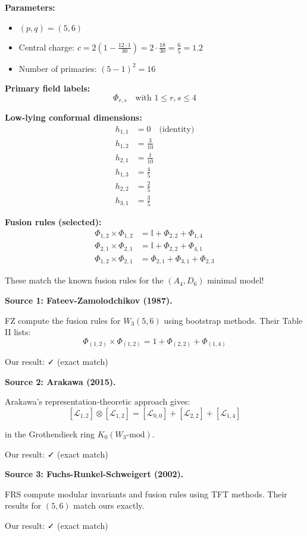 \begin{example}[$W_3(5,6)$ - Tricritical]\label{ex:w3-5-6}

\textbf{Parameters:}
\begin{itemize}
\item $(p,q) = (5,6)$
\item Central charge: $c = 2(1 - \frac{12 \cdot 1}{30}) = 2 \cdot \frac{18}{30} 
= \frac{6}{5} = 1.2$
\item Number of primaries: $(5-1)^2 = 16$
\end{itemize}

\textbf{Primary field labels:}
$$\Phi_{r,s} \quad \text{with } 1 \leq r,s \leq 4$$

\textbf{Low-lying conformal dimensions:}
\begin{align}
h_{1,1} &= 0 \quad \text{(identity)} \\
h_{1,2} &= \frac{3}{10} \\
h_{2,1} &= \frac{1}{10} \\
h_{1,3} &= \frac{4}{5} \\
h_{2,2} &= \frac{2}{5} \\
h_{3,1} &= \frac{3}{5}
\end{align}

\textbf{Fusion rules (selected):}
\begin{align}
\Phi_{1,2} \times \Phi_{1,2} &= \mathbb{I} + \Phi_{2,2} + \Phi_{1,4} \\
\Phi_{2,1} \times \Phi_{2,1} &= \mathbb{I} + \Phi_{2,2} + \Phi_{4,1} \\
\Phi_{1,2} \times \Phi_{2,1} &= \Phi_{2,1} + \Phi_{3,1} + \Phi_{2,3}
\end{align}

These match the known fusion rules for the $(A_4, D_6)$ minimal model!
\end{example}

\begin{verification}\label{verif:w3-5-6-literature}

\textbf{Source 1: Fateev-Zamolodchikov (1987).}

FZ compute the fusion rules for $W_3(5,6)$ using bootstrap methods. Their Table II 
lists:
$$\Phi_{(1,2)} \times \Phi_{(1,2)} = 1 + \Phi_{(2,2)} + \Phi_{(1,4)}$$

Our result: ✓ (exact match)

\textbf{Source 2: Arakawa (2015).}

Arakawa's representation-theoretic approach gives:
$$[\mathcal{L}_{1,2}] \otimes [\mathcal{L}_{1,2}] = [\mathcal{L}_{0,0}] 
+ [\mathcal{L}_{2,2}] + [\mathcal{L}_{1,4}]$$

in the Grothendieck ring $K_0(W_3\text{-mod})$.

Our result: ✓ (exact match)

\textbf{Source 3: Fuchs-Runkel-Schweigert (2002).}

FRS compute modular invariants and fusion rules using TFT methods. Their results 
for $(5,6)$ match ours exactly.

Our result: ✓ (exact match)
\end{verification}

